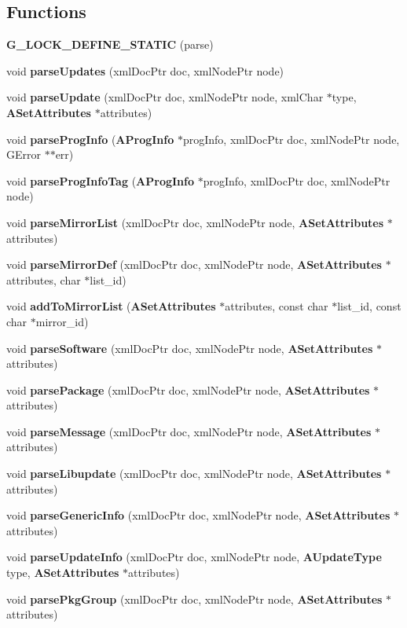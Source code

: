 \subsection*{Functions}
\begin{CompactItemize}
\item 
{\bf G\_\-LOCK\_\-DEFINE\_\-STATIC} (parse)
\item 
void {\bf parse\-Updates} (xml\-Doc\-Ptr doc, xml\-Node\-Ptr node)
\item 
void {\bf parse\-Update} (xml\-Doc\-Ptr doc, xml\-Node\-Ptr node, xml\-Char $\ast$type, {\bf ASet\-Attributes} $\ast$attributes)
\item 
void {\bf parse\-Prog\-Info} ({\bf AProg\-Info} $\ast$prog\-Info, xml\-Doc\-Ptr doc, xml\-Node\-Ptr node, GError $\ast$$\ast$err)
\item 
void {\bf parse\-Prog\-Info\-Tag} ({\bf AProg\-Info} $\ast$prog\-Info, xml\-Doc\-Ptr doc, xml\-Node\-Ptr node)
\item 
void {\bf parse\-Mirror\-List} (xml\-Doc\-Ptr doc, xml\-Node\-Ptr node, {\bf ASet\-Attributes} $\ast$attributes)
\item 
void {\bf parse\-Mirror\-Def} (xml\-Doc\-Ptr doc, xml\-Node\-Ptr node, {\bf ASet\-Attributes} $\ast$attributes, char $\ast$list\_\-id)
\item 
void {\bf add\-To\-Mirror\-List} ({\bf ASet\-Attributes} $\ast$attributes, const char $\ast$list\_\-id, const char $\ast$mirror\_\-id)
\item 
void {\bf parse\-Software} (xml\-Doc\-Ptr doc, xml\-Node\-Ptr node, {\bf ASet\-Attributes} $\ast$attributes)
\item 
void {\bf parse\-Package} (xml\-Doc\-Ptr doc, xml\-Node\-Ptr node, {\bf ASet\-Attributes} $\ast$attributes)
\item 
void {\bf parse\-Message} (xml\-Doc\-Ptr doc, xml\-Node\-Ptr node, {\bf ASet\-Attributes} $\ast$attributes)
\item 
void {\bf parse\-Libupdate} (xml\-Doc\-Ptr doc, xml\-Node\-Ptr node, {\bf ASet\-Attributes} $\ast$attributes)
\item 
void {\bf parse\-Generic\-Info} (xml\-Doc\-Ptr doc, xml\-Node\-Ptr node, {\bf ASet\-Attributes} $\ast$attributes)
\item 
void {\bf parse\-Update\-Info} (xml\-Doc\-Ptr doc, xml\-Node\-Ptr node, {\bf AUpdate\-Type} type, {\bf ASet\-Attributes} $\ast$attributes)
\item 
void {\bf parse\-Pkg\-Group} (xml\-Doc\-Ptr doc, xml\-Node\-Ptr node, {\bf ASet\-Attributes} $\ast$attributes)
$$
\end{CompactItemize}
